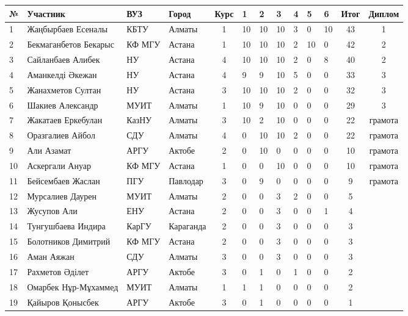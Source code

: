 \begin{tabular}{|l|l|l|p{2.2cm}|c|*{6}{p{0.3cm}|}c|c|}
\hline
№ & Участник & ВУЗ & Город & Курс & 1 & 2 & 3 & 4 & 5 & 6 & Итог & Диплом\\
\hline
1 & Жаңбырбаев Есеналы & КБТУ & Алматы & 1 & 10 & 10 & 10 & 3 & 0 & 10 & 43 & 1 \\ 
\hline
2 & Бекмаганбетов Бекарыс & КФ МГУ & Астана & 1 & 10 & 10 & 10 & 2 & 10 & 0 & 42 & 2 \\ 
\hline
3 & Сайланбаев Алибек & НУ & Астана &4 & 10 & 10 & 10 & 2 & 0 & 8 & 40 & 2 \\ 
\hline
4 & Аманкелді Әкежан & НУ & Астана &4 & 9 & 9 & 10 & 5 & 0 & 0 & 33 & 3 \\ 
\hline
5 & Жанахметов Султан & НУ & Астана &3 & 10 & 10 & 10 & 2 & 0 & 0 & 32 & 3 \\ 
\hline
6 & Шакиев Александр & МУИТ & Алматы & 1 & 10 & 9 & 10 & 0 & 0 & 0 & 29 & 3 \\ 
\hline
7 & Жакатаев Еркебулан & КазНУ & Алматы & 3 & 10 & 2 & 10 & 0 & 0 & 0 & 22 & грамота\\ 
\hline
8 & Оразгалиев Айбол & СДУ & Алматы & 4 & 0 & 10 & 10 & 2 & 0 & 0 & 22 & грамота\\ 
\hline
9 & Али Азамат & АРГУ & Актобе & 2 & 0 & 10 & 0 & 0 & 0 & 0 & 10 & грамота\\ 
\hline
10 & Аскергали Ануар & КФ МГУ & Астана & 1 & 0 & 0 & 10 & 0 & 0 & 0 & 10 & грамота\\ 
\hline
11 & Бейсембаев Жаслан & ПГУ & Павлодар & 3 & 0 & 9 & 0 & 0 & 0 & 0 & 9 & грамота\\ 
\hline
12 & Мурсалиев Даурен & МУИТ & Алматы & 2 & 0 & 0 & 3 & 2 & 0 & 0 & 5 & \\ 
\hline
13 & Жусупов Али & ЕНУ & Астана & 2 & 0 & 0 & 3 & 0 & 0 & 1 & 4 & \\ 
\hline
14 & Тунгушбаева Индира & КарГУ & Караганда & 2 & 0 & 0 & 3 & 0 & 0 & 0 & 3 & \\ 
\hline
15 & Болотников Димитрий & КФ МГУ & Астана & 2 & 0 & 0 & 3 & 0 & 0 & 0 & 3 & \\ 
\hline
16 & Аман Аяжан & СДУ & Алматы & 3 & 0 & 0 & 3 & 0 & 0 & 0 & 3 & \\ 
\hline
17 & Рахметов Әділет & АРГУ & Актобе & 3 & 0 & 1 & 0 & 1 & 0 & 0 & 2 & \\ 
\hline
18 & Омарбек Нұр-Мұхаммед & МУИТ & Алматы & 1 & 1 & 1 & 0 & 0 & 0 & 0 & 2 & \\ 
\hline
19 & Қайыров Қонысбек & АРГУ & Актобе & 3 & 0 & 1 & 0 & 0 & 0 & 0 & 1 & \\ 
\hline
\end{tabular}

